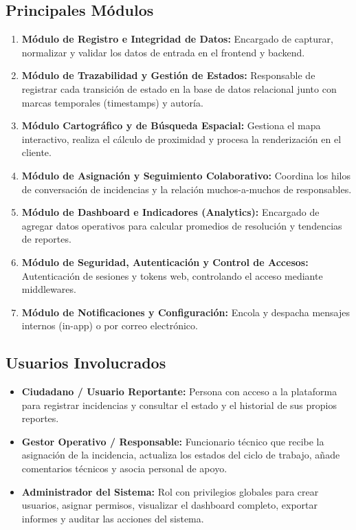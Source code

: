 \subsection{Principales Módulos}
\begin{enumerate}
    \item \textbf{Módulo de Registro e Integridad de Datos:} Encargado de capturar, normalizar y validar los datos de entrada en el frontend y backend.
    \item \textbf{Módulo de Trazabilidad y Gestión de Estados:} Responsable de registrar cada transición de estado en la base de datos relacional junto con marcas temporales (timestamps) y autoría.
    \item \textbf{Módulo Cartográfico y de Búsqueda Espacial:} Gestiona el mapa interactivo, realiza el cálculo de proximidad y procesa la renderización en el cliente.
    \item \textbf{Módulo de Asignación y Seguimiento Colaborativo:} Coordina los hilos de conversación de incidencias y la relación muchos-a-muchos de responsables.
    \item \textbf{Módulo de Dashboard e Indicadores (Analytics):} Encargado de agregar datos operativos para calcular promedios de resolución y tendencias de reportes.
    \item \textbf{Módulo de Seguridad, Autenticación y Control de Accesos:} Autenticación de sesiones y tokens web, controlando el acceso mediante middlewares.
    \item \textbf{Módulo de Notificaciones y Configuración:} Encola y despacha mensajes internos (in-app) o por correo electrónico.
\end{enumerate}

\subsection{Usuarios Involucrados}
\begin{itemize}
    \item \textbf{Ciudadano / Usuario Reportante:} Persona con acceso a la plataforma para registrar incidencias y consultar el estado y el historial de sus propios reportes.
    \item \textbf{Gestor Operativo / Responsable:} Funcionario técnico que recibe la asignación de la incidencia, actualiza los estados del ciclo de trabajo, añade comentarios técnicos y asocia personal de apoyo.
    \item \textbf{Administrador del Sistema:} Rol con privilegios globales para crear usuarios, asignar permisos, visualizar el dashboard completo, exportar informes y auditar las acciones del sistema.
\end{itemize}
